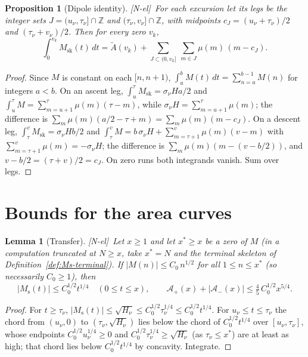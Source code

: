\documentclass[11pt]{amsart}
\numberwithin{equation}{section}
\theoremstyle{plain}
\newtheorem{proposition}[theorem]{Proposition}
\newtheorem{lemma}[theorem]{Lemma}
\theoremstyle{definition}
\theoremstyle{remark}
\newcommand{\Ms}{M_{\mathrm{s}}}
\newcommand{\Msk}{M_{\mathrm{sk}}}
\newcommand{\Ap}{\mathcal{A}_{+}}
\newcommand{\Am}{\mathcal{A}_{-}}
\newcommand{\tagNE}{\textup{[N-el]}}
\begin{document}
\begin{proposition}[Dipole identity]
\label{prop:dipoles}
\tagNE\ For each excursion let its \emph{legs} be the integer sets
$J=(u_\nu,\tau_\nu]\cap\mathbb{Z}$ and
$(\tau_\nu,v_\nu]\cap\mathbb{Z}$, with midpoints $c_J=(u_\nu+\tau_\nu)/2$
and $(\tau_\nu+v_\nu)/2$. Then for every zero $v_k$,
\begin{equation}
\label{eq:dipoles}
  \int_0^{v_k}\Msk(t)\,dt=\widetilde{A}(v_k)
  +\sum_{J\subset(0,v_k]}\ \sum_{m\in J}\mu(m)\,(m-c_J).
\end{equation}
\end{proposition}

\begin{proof}
Since $M$ is constant on each $[n,n+1)$, $\int_a^bM(t)\,dt=\sum_{n=a}^{b-1}M(n)$
for integers $a<b$. On an ascent leg, $\int_{u}^{\tau}\Msk=\sigma_\nu H a/2$ and
$\int_u^\tau M=\sum_{m=u+1}^{\tau}\mu(m)(\tau-m)$, while
$\sigma_\nu H=\sum_{m=u+1}^{\tau}\mu(m)$; the difference is
$\sum_m\mu(m)(a/2-\tau+m)=\sum_m\mu(m)(m-c_J)$. On a descent leg,
$\int_\tau^v\Msk=\sigma_\nu Hb/2$ and
$\int_\tau^vM=b\,\sigma_\nu H+\sum_{m=\tau+1}^{v}\mu(m)(v-m)$ with
$\sum_{m=\tau+1}^{v}\mu(m)=-\sigma_\nu H$; the difference is
$\sum_m\mu(m)(m-(v-b/2))$, and $v-b/2=(\tau+v)/2=c_J$. On zero runs
both integrands vanish. Sum over legs.
\end{proof}


\section{Bounds for the area curves}
\label{sec:bounds}

\begin{lemma}[Transfer]
\label{lem:transfer}
\tagNE\ Let $x\ge1$ and let $x^*\ge x$ be a zero of $M$ (in a computation truncated
at $N\ge x$, take $x^*=N$ and the terminal skeleton of
Definition~\ref{def:Ms-terminal}). If $|M(n)|\le C_0\,n^{1/2}$ for all
$1\le n\le x^*$ (so necessarily $C_0\ge1$), then
\begin{equation}
\label{eq:transfer_bound}
  |\Ms(t)|\le C_0^{1/2}t^{1/4}\quad(0\le t\le x),\qquad
  \Ap(x)+|\Am(x)|\le\tfrac45\,C_0^{1/2}x^{5/4}.
\end{equation}
\end{lemma}

\begin{proof}
For $t\ge\tau_\nu$, $|\Ms(t)|\le\sqrt{H_\nu}\le C_0^{1/2}\tau_\nu^{1/4}\le
C_0^{1/2}t^{1/4}$. For $u_\nu\le t\le\tau_\nu$ the chord from $(u_\nu,0)$ to
$(\tau_\nu,\sqrt{H_\nu})$ lies below the chord of $C_0^{1/2}t^{1/4}$ over
$[u_\nu,\tau_\nu]$, whose endpoints $C_0^{1/2}u_\nu^{1/4}\ge0$ and
$C_0^{1/2}\tau_\nu^{1/4}\ge\sqrt{H_\nu}$ (as $\tau_\nu\le x^*$) are at
least as high; that chord lies below $C_0^{1/2}t^{1/4}$ by concavity.
Integrate.
\end{proof}
\end{document}
